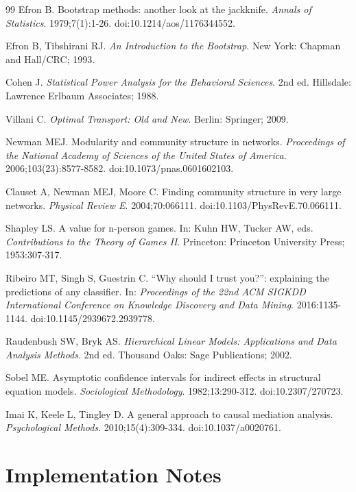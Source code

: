 \documentclass[11pt]{article}
\begin{document}
\begin{thebibliography}{99}
Efron B. Bootstrap methods: another look at the jackknife. \textit{Annals of
Statistics}. 1979;7(1):1-26. doi:10.1214/aos/1176344552.

Efron B, Tibshirani RJ. \textit{An Introduction to the Bootstrap}. New York:
Chapman and Hall/CRC; 1993.

Cohen J. \textit{Statistical Power Analysis for the Behavioral Sciences}. 2nd
ed. Hillsdale: Lawrence Erlbaum Associates; 1988.

Villani C. \textit{Optimal Transport: Old and New}. Berlin: Springer; 2009.

Newman MEJ. Modularity and community structure in networks. \textit{Proceedings
of the National Academy of Sciences of the United States of America}.
2006;103(23):8577-8582. doi:10.1073/pnas.0601602103.

Clauset A, Newman MEJ, Moore C. Finding community structure in very large
networks. \textit{Physical Review E}. 2004;70:066111.
doi:10.1103/PhysRevE.70.066111.

Shapley LS. A value for n-person games. In: Kuhn HW, Tucker AW, eds.
\textit{Contributions to the Theory of Games II}. Princeton: Princeton
University Press; 1953:307-317.

Ribeiro MT, Singh S, Guestrin C. ``Why should I trust you?'': explaining the
predictions of any classifier. In: \textit{Proceedings of the 22nd ACM SIGKDD
International Conference on Knowledge Discovery and Data Mining}. 2016:1135-1144.
doi:10.1145/2939672.2939778.

Raudenbush SW, Bryk AS. \textit{Hierarchical Linear Models: Applications and
Data Analysis Methods}. 2nd ed. Thousand Oaks: Sage Publications; 2002.

Sobel ME. Asymptotic confidence intervals for indirect effects in structural
equation models. \textit{Sociological Methodology}. 1982;13:290-312.
doi:10.2307/270723.

Imai K, Keele L, Tingley D. A general approach to causal mediation analysis.
\textit{Psychological Methods}. 2010;15(4):309-334. doi:10.1037/a0020761.

\end{thebibliography}

\section*{Implementation Notes}
\end{document}
